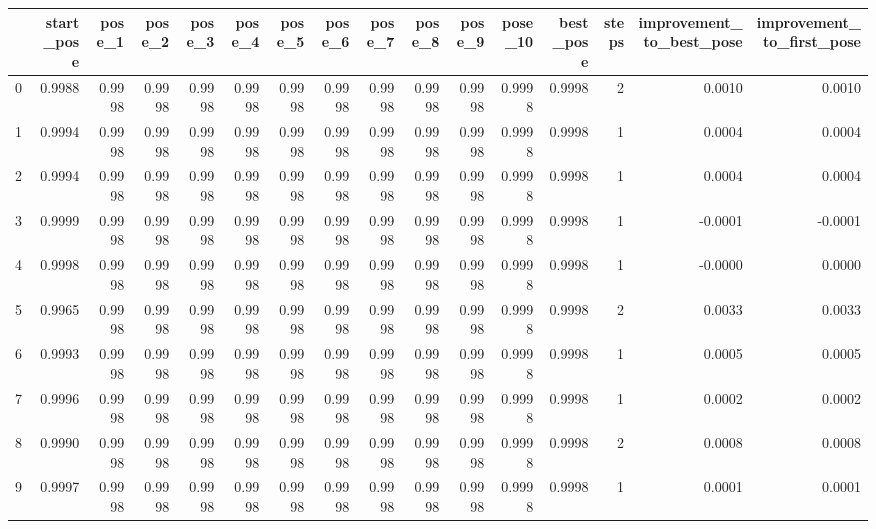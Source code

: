 \begin{tabular}{lrrrrrrrrrrrrrrr}
\toprule
{} &  start\_pose &  pose\_1 &  pose\_2 &  pose\_3 &  pose\_4 &  pose\_5 &  pose\_6 &  pose\_7 &  pose\_8 &  pose\_9 &  pose\_10 &  best\_pose &  steps &  improvement\_to\_best\_pose &  improvement\_to\_first\_pose \\
\midrule
0 &      0.9988 &  0.9998 &  0.9998 &  0.9998 &  0.9998 &  0.9998 &  0.9998 &  0.9998 &  0.9998 &  0.9998 &   0.9998 &     0.9998 &      2 &                    0.0010 &                     0.0010 \\
1 &      0.9994 &  0.9998 &  0.9998 &  0.9998 &  0.9998 &  0.9998 &  0.9998 &  0.9998 &  0.9998 &  0.9998 &   0.9998 &     0.9998 &      1 &                    0.0004 &                     0.0004 \\
2 &      0.9994 &  0.9998 &  0.9998 &  0.9998 &  0.9998 &  0.9998 &  0.9998 &  0.9998 &  0.9998 &  0.9998 &   0.9998 &     0.9998 &      1 &                    0.0004 &                     0.0004 \\
3 &      0.9999 &  0.9998 &  0.9998 &  0.9998 &  0.9998 &  0.9998 &  0.9998 &  0.9998 &  0.9998 &  0.9998 &   0.9998 &     0.9998 &      1 &                   -0.0001 &                    -0.0001 \\
4 &      0.9998 &  0.9998 &  0.9998 &  0.9998 &  0.9998 &  0.9998 &  0.9998 &  0.9998 &  0.9998 &  0.9998 &   0.9998 &     0.9998 &      1 &                   -0.0000 &                     0.0000 \\
5 &      0.9965 &  0.9998 &  0.9998 &  0.9998 &  0.9998 &  0.9998 &  0.9998 &  0.9998 &  0.9998 &  0.9998 &   0.9998 &     0.9998 &      2 &                    0.0033 &                     0.0033 \\
6 &      0.9993 &  0.9998 &  0.9998 &  0.9998 &  0.9998 &  0.9998 &  0.9998 &  0.9998 &  0.9998 &  0.9998 &   0.9998 &     0.9998 &      1 &                    0.0005 &                     0.0005 \\
7 &      0.9996 &  0.9998 &  0.9998 &  0.9998 &  0.9998 &  0.9998 &  0.9998 &  0.9998 &  0.9998 &  0.9998 &   0.9998 &     0.9998 &      1 &                    0.0002 &                     0.0002 \\
8 &      0.9990 &  0.9998 &  0.9998 &  0.9998 &  0.9998 &  0.9998 &  0.9998 &  0.9998 &  0.9998 &  0.9998 &   0.9998 &     0.9998 &      2 &                    0.0008 &                     0.0008 \\
9 &      0.9997 &  0.9998 &  0.9998 &  0.9998 &  0.9998 &  0.9998 &  0.9998 &  0.9998 &  0.9998 &  0.9998 &   0.9998 &     0.9998 &      1 &                    0.0001 &                     0.0001 \\
\bottomrule
\end{tabular}
